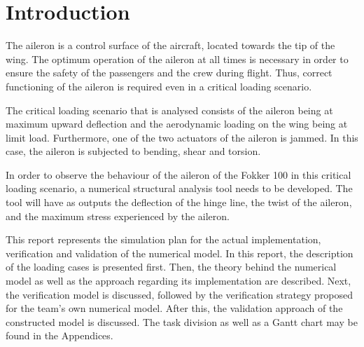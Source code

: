 \section{Introduction}
\label{Introduction}


The aileron is a control surface of the aircraft, located towards the tip of the wing. The optimum operation of the aileron at all times is necessary in order to ensure the safety of the passengers and the crew during flight. Thus, correct functioning of the aileron is required even in a critical loading scenario. 

The critical loading scenario that is analysed consists of the aileron being at maximum upward deflection and the aerodynamic loading on the
wing being at limit load. Furthermore, one of the two actuators of the aileron is jammed. In this case, the aileron is subjected to bending, shear and torsion. 

In order to observe the behaviour of the aileron of the Fokker 100 in this critical loading scenario, a numerical structural analysis tool needs to be developed. The tool will have as outputs the deflection of the hinge line, the twist of the aileron, and the maximum stress experienced by the aileron.

This report represents the simulation plan for the actual implementation, verification and validation of the numerical model. In this report, the description of the loading cases is presented first. Then, the theory behind the numerical model as well as the approach regarding its implementation are described. Next, the verification model is discussed, followed by the verification strategy proposed for the team's own numerical model. After this, the validation approach of the constructed model is discussed. The task division as well as a Gantt chart may be found in the Appendices.   
